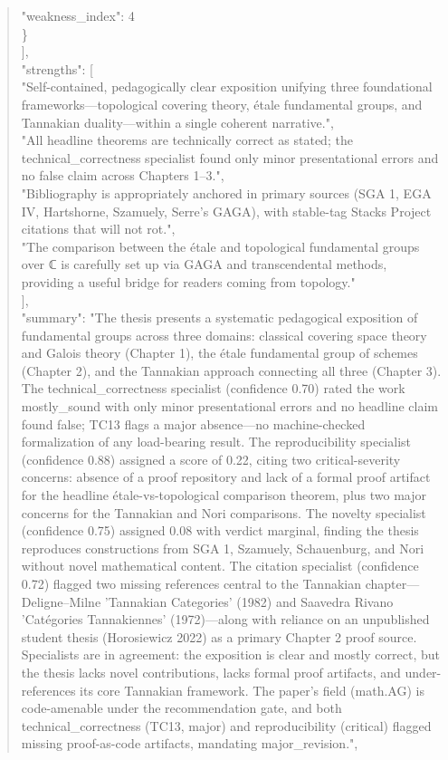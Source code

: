 \documentclass[11pt]{article}
\begin{document}
\begin{quote}
      "weakness\_index": 4\\
    \}\\
  ],\\
  "strengths": [\\
    "Self-contained, pedagogically clear exposition unifying three foundational frameworks---topological covering theory, étale fundamental groups, and Tannakian duality---within a single coherent narrative.",\\
    "All headline theorems are technically correct as stated; the technical\_correctness specialist found only minor presentational errors and no false claim across Chapters 1--3.",\\
    "Bibliography is appropriately anchored in primary sources (SGA 1, EGA IV, Hartshorne, Szamuely, Serre's GAGA), with stable-tag Stacks Project citations that will not rot.",\\
    "The comparison between the étale and topological fundamental groups over ℂ is carefully set up via GAGA and transcendental methods, providing a useful bridge for readers coming from topology."\\
  ],\\
  "summary": "The thesis presents a systematic pedagogical exposition of fundamental groups across three domains: classical covering space theory and Galois theory (Chapter 1), the étale fundamental group of schemes (Chapter 2), and the Tannakian approach connecting all three (Chapter 3). The technical\_correctness specialist (confidence 0.70) rated the work mostly\_sound with only minor presentational errors and no headline claim found false; TC13 flags a major absence---no machine-checked formalization of any load-bearing result. The reproducibility specialist (confidence 0.88) assigned a score of 0.22, citing two critical-severity concerns: absence of a proof repository and lack of a formal proof artifact for the headline étale-vs-topological comparison theorem, plus two major concerns for the Tannakian and Nori comparisons. The novelty specialist (confidence 0.75) assigned 0.08 with verdict marginal, finding the thesis reproduces constructions from SGA 1, Szamuely, Schauenburg, and Nori without novel mathematical content. The citation specialist (confidence 0.72) flagged two missing references central to the Tannakian chapter---Deligne--Milne 'Tannakian Categories' (1982) and Saavedra Rivano 'Catégories Tannakiennes' (1972)---along with reliance on an unpublished student thesis (Horosiewicz 2022) as a primary Chapter 2 proof source. Specialists are in agreement: the exposition is clear and mostly correct, but the thesis lacks novel contributions, lacks formal proof artifacts, and under-references its core Tannakian framework. The paper's field (math.AG) is code-amenable under the recommendation gate, and both technical\_correctness (TC13, major) and reproducibility (critical) flagged missing proof-as-code artifacts, mandating major\_revision.",\\

\end{quote}
\end{document}
